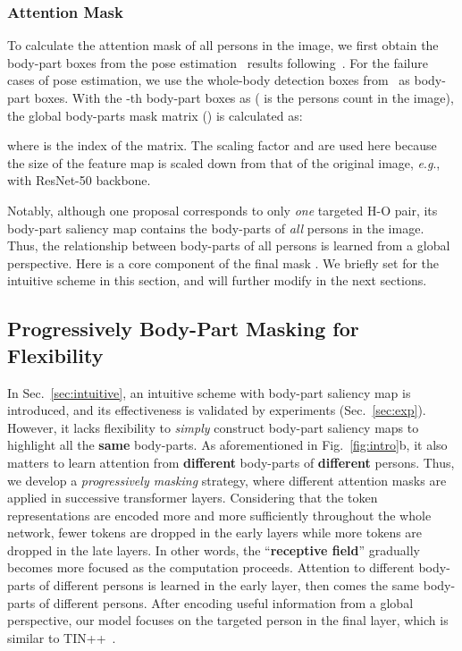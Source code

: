 \documentclass[runningheads]{llncs}
\newcommand{\eg}{\textit{e}.\textit{g}.}
\begin{document}
\subsubsection{Attention Mask}
To calculate the attention mask of all persons in the image, we first obtain the body-part boxes from the pose estimation~\cite{fang2017rmpe,li2019crowdpose,li2021human} results following~\cite{li2021transferable}. 
For the failure cases of pose estimation, we use the whole-body detection boxes from~\cite{ren2015faster} as body-part boxes.
With the -th body-part boxes as  ( is the persons count in the image),
the global body-parts mask matrix  
() 
is calculated as:

where  is the index of the matrix. The scaling factor  and  are used here because the size of the feature map  is scaled down from that of the original image, 
\eg,  with ResNet-50 backbone. 

Notably, although one proposal corresponds to only \textit{one} targeted H-O pair, its body-part saliency map contains the body-parts of \textit{all} persons in the image. Thus, the relationship between body-parts of all persons is learned from a global perspective.
Here   is a core component of the final mask . 
We briefly set  for the intuitive scheme in this section, and will further modify  in the next sections.

\subsection{Progressively Body-Part Masking for Flexibility}
\label{sec:progressive}
In Sec.~\ref{sec:intuitive}, an intuitive scheme with body-part saliency map is introduced, and its effectiveness is validated by experiments (Sec.~\ref{sec:exp}).
However, it lacks flexibility to \textit{simply} construct body-part saliency maps to highlight all the \textbf{same} body-parts.
As aforementioned in Fig.~\ref{fig:intro}b, it also matters to learn attention from \textbf{different} body-parts of \textbf{different} persons.
Thus, we develop a \textit{progressively masking} strategy, where different attention masks are applied in successive transformer layers.
Considering that the token representations are encoded more and more sufficiently throughout the whole network, fewer tokens are dropped in the early layers while more tokens are dropped in the late layers. In other words, the ``\textbf{receptive field}'' gradually becomes more focused as the computation proceeds. Attention to different body-parts of different persons is learned in the early layer, then comes the same body-parts of different persons. After encoding useful information from a global perspective, our model focuses on the targeted person in the final layer, which is similar to TIN++~\cite{li2021transferable}.
\end{document}
